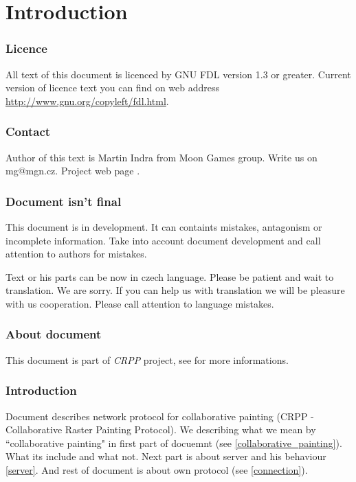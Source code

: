 \part{Introduction}

\section{Licence}

All text of this document is licenced by GNU FDL version 1.3 or greater. Current version of licence text you can find on web address \url{http://www.gnu.org/copyleft/fdl.html}.

\section{Contact}

Author of this text is Martin Indra from Moon Games group. Write us on mg@mgn.cz. Project web page \webURL{}.

\section{Document isn't final}

This document is in development. It can containts mistakes, antagonism or incomplete information. Take into account document development and call attention to authors for mistakes.

Text or his parts can be now in czech language. Please be patient and wait to translation. We are sorry. If you can help us with translation we will be pleasure with us cooperation. Please call attention to language mistakes.

\section{About document}

This document is part of \emph{CRPP} project, see \webURL for more informations.

\section{Introduction}

Document describes network protocol for collaborative painting (CRPP - Collaborative Raster Painting Protocol). We describing what we mean by ``collaborative painting" in first part of docuemnt (see \ref{collaborative_painting}). What its include and what not. Next part is about server and his behaviour \ref{server}. And rest of document is about own protocol (see \ref{connection}).

